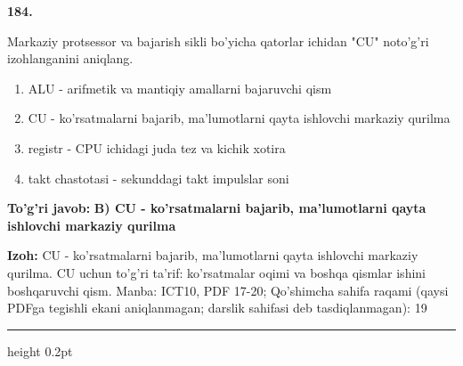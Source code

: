 \documentclass[10pt,a4paper]{article}
\begin{document}
{\bfseries\sffamily\color{ink} 184.}
\par
Markaziy protsessor va bajarish sikli bo'yicha qatorlar ichidan "CU" noto'g'ri izohlanganini aniqlang.
\begin{enumerate}[label=\Alph*),leftmargin=9mm]
\item ALU - arifmetik va mantiqiy amallarni bajaruvchi qism
\item CU - ko'rsatmalarni bajarib, ma'lumotlarni qayta ishlovchi markaziy qurilma
\item registr - CPU ichidagi juda tez va kichik xotira
\item takt chastotasi - sekunddagi takt impulslar soni
\end{enumerate}
\begin{tcolorbox}[enhanced,breakable,colback=teal!4,colframe=teal!60!black,boxrule=0.45pt,arc=1.2mm,left=2.7mm,right=2.7mm,top=1.8mm,bottom=1.8mm,before skip=2mm,after skip=2mm]
{\bfseries\sffamily\color{teal}To'g'ri javob:} \textbf{B) CU - ko'rsatmalarni bajarib, ma'lumotlarni qayta ishlovchi markaziy qurilma}
\par\smallskip
{\bfseries Izoh:} CU - ko'rsatmalarni bajarib, ma'lumotlarni qayta ishlovchi markaziy qurilma. CU uchun to'g'ri ta'rif: ko'rsatmalar oqimi va boshqa qismlar ishini boshqaruvchi qism. Manba: ICT10, PDF 17-20; Qo'shimcha sahifa raqami (qaysi PDFga tegishli ekani aniqlanmagan; darslik sahifasi deb tasdiqlanmagan): 19
\end{tcolorbox}
\vspace{2mm}\hrule height 0.2pt\vspace{3mm}
\end{document}
